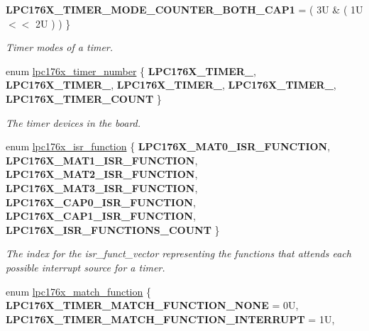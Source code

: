 \begin{DoxyCompactItemize}
{\bfseries L\+P\+C176\+X\+\_\+\+T\+I\+M\+E\+R\+\_\+\+M\+O\+D\+E\+\_\+\+C\+O\+U\+N\+T\+E\+R\+\_\+\+B\+O\+T\+H\+\_\+\+C\+A\+P1} = ( 3U \& ( 1U $<$$<$ 2U ) )
 \}
\begin{DoxyCompactList}\small\item\em Timer modes of a timer. \end{DoxyCompactList}\item 
enum \mbox{\hyperlink{timer-defs_8h_a23c6cc7925b3e04973ecb1cc9f3706d1}{lpc176x\+\_\+timer\+\_\+number}} \{ \newline
{\bfseries L\+P\+C176\+X\+\_\+\+T\+I\+M\+E\+R\+\_}, 
{\bfseries L\+P\+C176\+X\+\_\+\+T\+I\+M\+E\+R\+\_}, 
{\bfseries L\+P\+C176\+X\+\_\+\+T\+I\+M\+E\+R\+\_}, 
{\bfseries L\+P\+C176\+X\+\_\+\+T\+I\+M\+E\+R\+\_}, 
\newline
{\bfseries L\+P\+C176\+X\+\_\+\+T\+I\+M\+E\+R\+\_\+\+C\+O\+U\+NT}
 \}
\begin{DoxyCompactList}\small\item\em The timer devices in the board. \end{DoxyCompactList}\item 
enum \mbox{\hyperlink{timer-defs_8h_ab4865a5da7fb70b3fbfa160ab5caf633}{lpc176x\+\_\+isr\+\_\+function}} \{ \newline
{\bfseries L\+P\+C176\+X\+\_\+\+M\+A\+T0\+\_\+\+I\+S\+R\+\_\+\+F\+U\+N\+C\+T\+I\+ON}, 
{\bfseries L\+P\+C176\+X\+\_\+\+M\+A\+T1\+\_\+\+I\+S\+R\+\_\+\+F\+U\+N\+C\+T\+I\+ON}, 
{\bfseries L\+P\+C176\+X\+\_\+\+M\+A\+T2\+\_\+\+I\+S\+R\+\_\+\+F\+U\+N\+C\+T\+I\+ON}, 
{\bfseries L\+P\+C176\+X\+\_\+\+M\+A\+T3\+\_\+\+I\+S\+R\+\_\+\+F\+U\+N\+C\+T\+I\+ON}, 
\newline
{\bfseries L\+P\+C176\+X\+\_\+\+C\+A\+P0\+\_\+\+I\+S\+R\+\_\+\+F\+U\+N\+C\+T\+I\+ON}, 
{\bfseries L\+P\+C176\+X\+\_\+\+C\+A\+P1\+\_\+\+I\+S\+R\+\_\+\+F\+U\+N\+C\+T\+I\+ON}, 
{\bfseries L\+P\+C176\+X\+\_\+\+I\+S\+R\+\_\+\+F\+U\+N\+C\+T\+I\+O\+N\+S\+\_\+\+C\+O\+U\+NT}
 \}
\begin{DoxyCompactList}\small\item\em The index for the isr\+\_\+funct\+\_\+vector representing the functions that attends each possible interrupt source for a timer. \end{DoxyCompactList}\item 
enum \mbox{\hyperlink{timer-defs_8h_a8e5f6514d6375d97fe49f7674968e244}{lpc176x\+\_\+match\+\_\+function}} \{ {\bfseries L\+P\+C176\+X\+\_\+\+T\+I\+M\+E\+R\+\_\+\+M\+A\+T\+C\+H\+\_\+\+F\+U\+N\+C\+T\+I\+O\+N\+\_\+\+N\+O\+NE} = 0U, 
{\bfseries L\+P\+C176\+X\+\_\+\+T\+I\+M\+E\+R\+\_\+\+M\+A\+T\+C\+H\+\_\+\+F\+U\+N\+C\+T\+I\+O\+N\+\_\+\+I\+N\+T\+E\+R\+R\+U\+PT} = 1U, 
$$
\end{DoxyCompactItemize}
